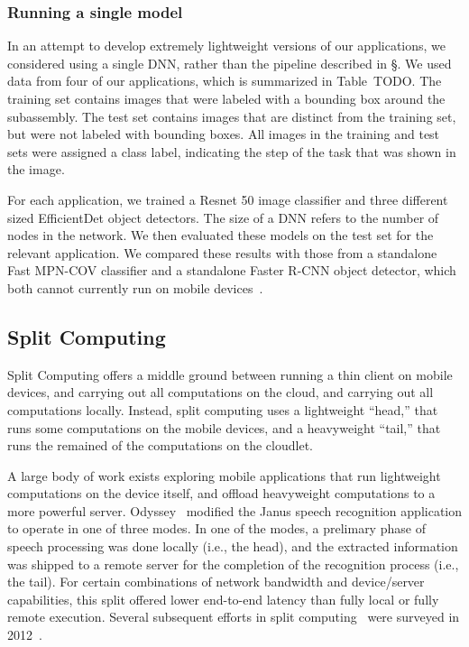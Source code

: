 \subsubsection{Running a single model}

In an attempt to develop extremely lightweight versions of our applications,
we considered using a single DNN, rather than the pipeline described in
\S\label{sec:two_stage}.
We used data from four of our applications, which is summarized in Table~TODO.
The training set contains images that were labeled with a bounding box around
the subassembly.
The test set contains images that are distinct from the training set, but were
not labeled with bounding boxes.
All images in the training and test sets were assigned a class label, indicating
the step of the task that was shown in the image.

For each application, we trained a Resnet 50 image classifier and three
different sized EfficientDet object detectors.
The size of a DNN refers to the number of nodes in the network.
We then evaluated these models on the test set for the relevant application.
We compared these results with those from a standalone Fast MPN-COV classifier
and a standalone Faster R-CNN object detector, which both cannot currently run
on mobile devices~\cite{tflite, torchscript}.

\subsection{Split Computing}

Split Computing offers a middle ground between running a thin client on mobile
devices, and carrying out all computations on the cloud, and carrying out all
computations locally.
Instead, split computing uses a lightweight ``head,'' that runs some
computations on the mobile devices, and a heavyweight ``tail,'' that runs the
remained of the computations on the cloudlet.

A large body of work exists exploring mobile applications that run lightweight
computations on the device itself, and offload heavyweight computations to a
more powerful server.
Odyssey~\cite{Noble1997} modified the Janus speech recognition application to
operate in one of three modes.
In one of the modes, a prelimary phase of speech
processing was done locally (i.e., the head), and the extracted
information was shipped to a remote server for the completion of the
recognition process (i.e., the tail).
For certain combinations of
network bandwidth and device/server capabilities, this split offered
lower end-to-end latency than fully local or fully remote execution.
Several subsequent efforts in split computing~\cite{Balan2002, Flinn2001,
  Flinn2003b, Narayanan2003, Goyal2004, Su2005, Ok2007, Balan2007,
  Kristensen2008} were surveyed in 2012~\cite{Flinn2012}.

